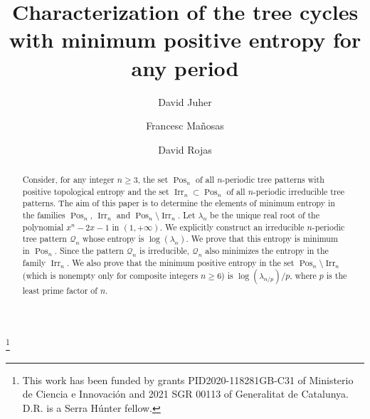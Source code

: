 \documentclass[a4paper]{amsart}
\theoremstyle{definition}
\DeclareMathOperator{\Pos}{Pos}
\DeclareMathOperator{\Irr}{Irr}
\begin{document}
\title[Minimum positive entropy for tree cycles in any period]{Characterization of the tree cycles with minimum positive entropy for any period}
\author{David Juher \and Francesc Ma\~{n}osas \and David Rojas}

\address{Departament d'Inform\`atica, Matem\`atica Aplicada i Estad\'{\i}stica,
Universitat de Gi\-ro\-na, c/ Maria Aur\`elia Capmany 61, 17003 Girona, Spain.
ORCID 0000-0001-5440-1705}

\address{Departament de Matem\`atiques, Edifici C, Universitat
Aut\`onoma de Barcelona, 08913 Cerdanyola del Vall\`es, Barcelona, Spain. ORCID 0000-0003-2535-0501}

\address{Departament d'Inform\`atica, Matem\`atica Aplicada i Estad\'{\i}stica,
Universitat de Gi\-ro\-na, c/ Maria Aur\`elia Capmany 61, 17003 Girona, Spain. ORCID 0000-0001-7247-4705}


\thanks{This work has been funded by grants PID2020-118281GB-C31 of Ministerio de Ciencia e Innovaci\'on and 2021 SGR 00113 of Ge\-ne\-ra\-litat de Catalunya. D.R. is a Serra H\'unter fellow.}



\begin{abstract}
Consider, for any integer $n\ge3$, the set $\Pos_n$ of all $n$-periodic tree patterns
with positive topological entropy and the set $\Irr_n\subset\Pos_n$ of all $n$-periodic
irreducible tree patterns. The aim of this paper is to determine the elements of minimum
entropy in the families $\Pos_n$, $\Irr_n$ and $\Pos_n\setminus\Irr_n$. Let $\lambda_n$ be the unique
real root of the polynomial $x^n-2x-1$ in $(1,+\infty)$. We explicitly construct an
irreducible $n$-periodic tree pattern $\mathcal{Q}_n$ whose entropy is $\log(\lambda_n)$.
We prove that this entropy is minimum in $\Pos_n$. Since the pattern $\mathcal{Q}_n$ is
irreducible, $\mathcal{Q}_n$ also minimizes the entropy in the family $\Irr_n$. We also prove
that the minimum positive entropy in the set $\Pos_n\setminus\Irr_n$ (which is nonempty only
for composite integers $n\ge6$) is $\log(\lambda_{n/p})/p$, where $p$ is the least prime
factor of $n$.
\end{abstract}

\maketitle
\end{document}
